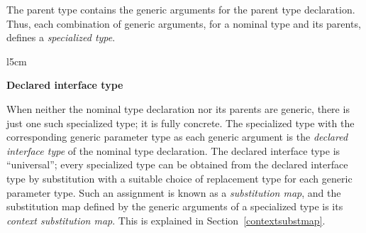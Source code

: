 \documentclass[../generics]{subfiles}
\begin{document}
\medskip

The parent type contains the generic arguments for the parent type declaration. Thus, each combination of generic arguments, for a nominal type and its parents, defines a \emph{specialized type}.

\begin{wrapfigure}[13]{l}{5cm}
\begin{center}\textbf{Declared interface type}\end{center}
\end{wrapfigure}

\smallskip

 When neither the nominal type declaration nor its parents are generic, there is just one such specialized type; it is fully concrete. The specialized type with the corresponding generic parameter type as each generic argument is the \emph{declared interface type} of the nominal type declaration. The declared interface type is ``universal''; every specialized type can be obtained from the declared interface type by substitution with a suitable choice of replacement type for each generic parameter type. Such an assignment is known as a \emph{substitution map}, and the substitution map defined by the generic arguments of a specialized type is its \emph{context substitution map}. This is explained in Section~\ref{contextsubstmap}.
\end{document}
